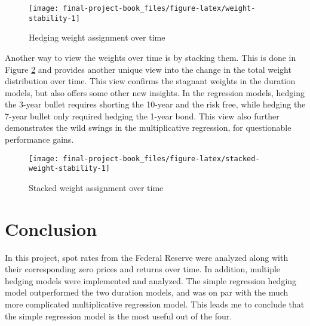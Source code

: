\documentclass[openany]{book}
\theoremstyle{definition}
\theoremstyle{definition}
\theoremstyle{definition}
\theoremstyle{remark}
\begin{document}
\small

\begin{figure}[H]

{\centering \texttt{[image: final-project-book\_files/figure-latex/weight-stability-1]} 

}

\caption{Hedging weight assignment over time}\label{fig:weight-stability}
\end{figure}

\normalsize

Another way to view the weights over time is by stacking them. This is
done in Figure \ref{fig:stacked-weight-stability} and provides another
unique view into the change in the total weight distribution over time.
This view confirms the stagnant weights in the duration models, but also
offers some other new insights. In the regression models, hedging the
3-year bullet requires shorting the 10-year and the risk free, while
hedging the 7-year bullet only required hedging the 1-year bond. This
view also further demonstrates the wild swings in the multiplicative
regression, for questionable performance gains.

\small

\begin{figure}[H]

{\centering \texttt{[image: final-project-book\_files/figure-latex/stacked-weight-stability-1]} 

}

\caption{Stacked weight assignment over time}\label{fig:stacked-weight-stability}
\end{figure}

\normalsize

\small

\normalsize

\hypertarget{conclusion}{%
\chapter{Conclusion}\label{conclusion}}

In this project, spot rates from the Federal Reserve were analyzed along
with their corresponding zero prices and returns over time. In addition,
multiple hedging models were implemented and analyzed. The simple
regression hedging model outperformed the two duration models, and was
on par with the much more complicated multiplicative regression model.
This leads me to conclude that the simple regression model is the most
useful out of the four.
\end{document}
